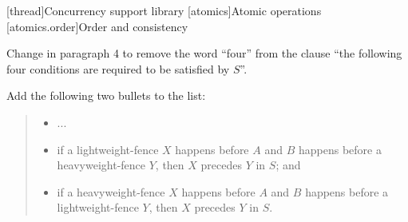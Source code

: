 

\setcounter{chapter}{32}
[thread]{Concurrency support library}
\setcounter{section}{4}
[atomics]{Atomic operations}
\setcounter{subsection}{3}
[atomics.order]{Order and consistency}

Change in  paragraph 4 to remove the word ``four'' from
the clause ``the following four conditions are required to be satisfied
by $S$''.

Add the following two bullets to the list:
\begin{quote}
\pnum
\begin{itemize}
\item
  ...
\item
if a  lightweight-fence $X$ happens before $A$ and $B$ happens
before a  heavyweight-fence $Y$, then $X$ precedes $Y$ in $S$; and
\item  if a  heavyweight-fence $X$ happens before $A$ and $B$ happens
before a  lightweight-fence $Y$, then $X$ precedes $Y$ in $S$.
\end{itemize}
\end{quote}
